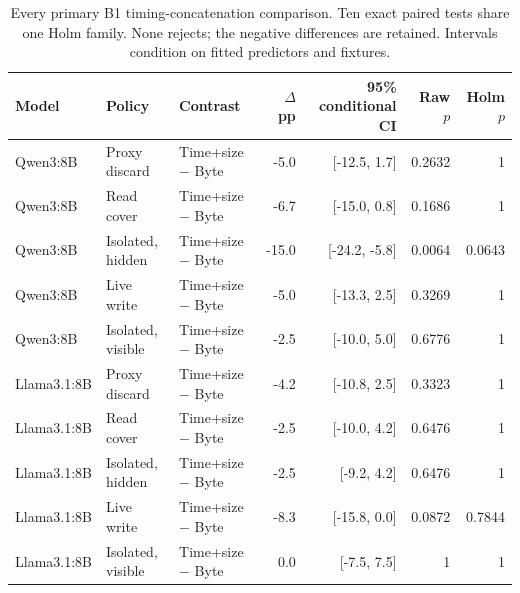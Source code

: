 \begin{table}[t]\centering\small
\caption{Every primary B1 timing-concatenation comparison. Ten exact paired tests share one Holm family. None rejects; the negative differences are retained. Intervals condition on fitted predictors and fixtures.}\label{tab:b1-primary}
\setlength{\tabcolsep}{4pt}
\begin{tabularx}{\textwidth}{@{}lP{.12\textwidth}Yrrrr@{}}\toprule
Model & Policy & Contrast & $\Delta$ pp & 95\% conditional CI & Raw $p$ & Holm $p$ \\\midrule
Qwen3:8B & Proxy discard & Time+size $-$ Byte & -5.0 & [-12.5, 1.7] & 0.2632 & 1 \\
Qwen3:8B & Read cover & Time+size $-$ Byte & -6.7 & [-15.0, 0.8] & 0.1686 & 1 \\
Qwen3:8B & Isolated, hidden & Time+size $-$ Byte & -15.0 & [-24.2, -5.8] & 0.0064 & 0.0643 \\
Qwen3:8B & Live write & Time+size $-$ Byte & -5.0 & [-13.3, 2.5] & 0.3269 & 1 \\
Qwen3:8B & Isolated, visible & Time+size $-$ Byte & -2.5 & [-10.0, 5.0] & 0.6776 & 1 \\
Llama3.1:8B & Proxy discard & Time+size $-$ Byte & -4.2 & [-10.8, 2.5] & 0.3323 & 1 \\
Llama3.1:8B & Read cover & Time+size $-$ Byte & -2.5 & [-10.0, 4.2] & 0.6476 & 1 \\
Llama3.1:8B & Isolated, hidden & Time+size $-$ Byte & -2.5 & [-9.2, 4.2] & 0.6476 & 1 \\
Llama3.1:8B & Live write & Time+size $-$ Byte & -8.3 & [-15.8, 0.0] & 0.0872 & 0.7844 \\
Llama3.1:8B & Isolated, visible & Time+size $-$ Byte & 0.0 & [-7.5, 7.5] & 1 & 1 \\
\bottomrule\end{tabularx}\end{table}
